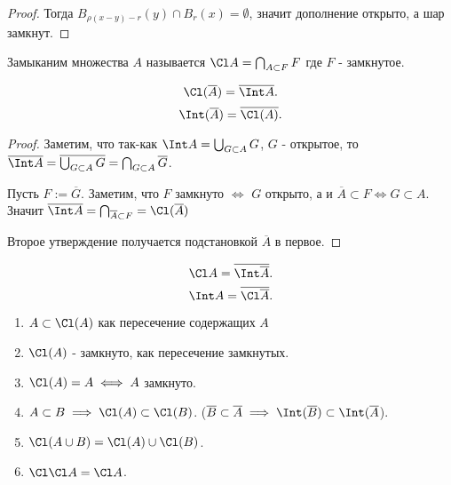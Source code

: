 \begin{theorem}
\begin{theorem}
\begin{enumerate}
\begin{proof}
                    Тогда $B_{\rho(x-y) - r}(y)\cap B_{r}(x) = \emptyset$, значит дополнение открыто, а шар замкнут.
                \end{proof}
        \end{enumerate}
    \end{theorem}
    \begin{definition} \thmslashn 
    
        Замыканим множества $A$ называется $\Cl A = \bigcap_{A \subset F} F$ где $F$ - замкнутое. 
    \end{definition}
    \begin{theorem} \thmslashn
    
        \[\Cl(\overline{A}) = \overline{\Int A}. \]
        \[ \Int(\overline{A}) = \overline{\Cl(A)} .\]
        \begin{proof}
            Заметим, что так-как $\Int A = \bigcup_{G \subset A} G$, $G$ - открытое, то $\overline{\Int A} = \overline{\bigcup_{G \subset A} G} = \bigcap_{G \subset A} \overline{G}$. 

            Пусть $F := \overline{G}$.
            Заметим, что $F$ замкнуто $\iff $ $G$ открыто, а и $\overline{A} \subset F \iff G \subset A$. Значит $\overline{\Int A} = \bigcap_{\overline{A} \subset F} = \Cl(\overline{A})$

            Второе утверждение получается подстановкой $\overline{A}$ в первое.
        \end{proof}
    \end{theorem}
\end{theorem}
\begin{consequence} \thmslashn

    \[ \Cl A = \overline{\Int \overline{A}} .\]
    \[ \Int A = \overline{\Cl \overline{A}} .\] 
\end{consequence}
\begin{properties} \thmslashn

    \begin{enumerate}
        \item $A \subset \Cl(A)$ как пересечение содержащих $A$
        \item $\Cl(A)$ - замкнуто, как пересечение замкнутых.
        \item $\Cl(A) = A \iff A$ замкнуто.
        \item $A \subset B \implies \Cl(A) \subset \Cl(B)$. ($\overline{B} \subset \overline{A} \implies \Int(\overline{B}) \subset \Int(\overline{A}$).
        \item $\Cl(A \cup B) = \Cl(A) \cup \Cl(B)$.
        \item $\Cl \Cl A = \Cl A$.
    \end{enumerate}
\end{properties}
